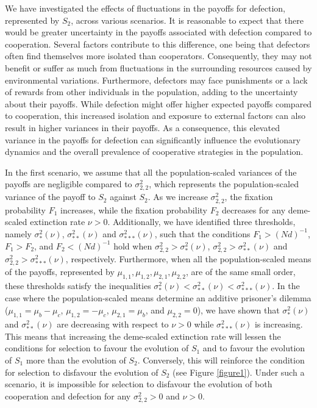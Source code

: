 \documentclass[11pt]{article}
\begin{document}
We have investigated the effects of fluctuations in the payoffs for defection, represented by $S_2$, across various scenarios. It is reasonable to expect that there would be greater uncertainty in the payoffs associated with defection compared to cooperation. Several factors contribute to this difference, one being that defectors often find themselves more isolated than cooperators. Consequently, they may not benefit or suffer as much from fluctuations in the surrounding resources caused by environmental variations.
Furthermore, defectors may face punishments or a lack of rewards from other individuals in the population, adding to the uncertainty about their payoffs. While defection might offer higher expected payoffs compared to cooperation, this increased isolation and exposure to external factors can also result in higher variances in their payoffs. As a consequence, this elevated variance in the payoffs for defection can significantly influence the evolutionary dynamics and the overall prevalence of cooperative strategies in the population.
 
 
In the first scenario, we assume that all the population-scaled variances of the payoffs are negligible compared to $\sigma_{2,2}^2$, which represents the population-scaled variance of the payoff to  $S_2$ against $S_2$. As we increase $\sigma_{2,2}^2$, the fixation probability $F_1$ increases, while the fixation probability $F_2$ decreases for any deme-scaled extinction rate $\nu>0$. Additionally, we have identified three thresholds, namely   $\sigma^2_{*}(\nu)$, $\sigma^2_{**}(\nu)$ and $\sigma^2_{***}(\nu)$, such that  the conditions  $F_1 > (Nd)^{-1}$, $F_1>F_2$, and $F_2<(Nd)^{-1}$  hold when $\sigma_{2,2}^2>\sigma^2_{*}(\nu)$, $\sigma_{2,2}^2>\sigma^2_{**}(\nu)$ and $\sigma_{2,2}^2>\sigma^2_{***}(\nu)$, respectively.  Furthermore, when all the population-scaled means of the payoffs, represented by  $\mu_{1,1}, \mu_{1,2}, \mu_{2,1}, \mu_{2,2}$, are of the same small order, these thresholds satisfy the inequalities $\sigma^2_{*}(\nu)<\sigma^2_{**}(\nu)<\sigma^2_{***}(\nu)$.
In the case where the population-scaled means determine an additive prisoner's dilemma ($\mu_{1,1}=\mu_b-\mu_c$, $\mu_{1,2}=-\mu_c$, $\mu_{2,1}=\mu_b$, and $\mu_{2,2}=0$), we have shown that  $\sigma^2_{*}(\nu)$ and $\sigma^2_{**}(\nu)$ are decreasing with respect to $\nu>0$ while  $\sigma^2_{***}(\nu)$ is increasing. This means that increasing the deme-scaled extinction rate will lessen the conditions for selection to favour the evolution of $S_1$ and to favour the evolution of $S_1$ more than the evolution of $S_2$. Conversely, this will reinforce the condition for selection to disfavour the evolution of $S_2$ (see Figure \ref{figure1}). Under such a scenario, it is impossible for selection to disfavour the evolution of both cooperation and defection for any $\sigma_{2,2}^2>0$ and $\nu>0$. 
 
\end{document}
